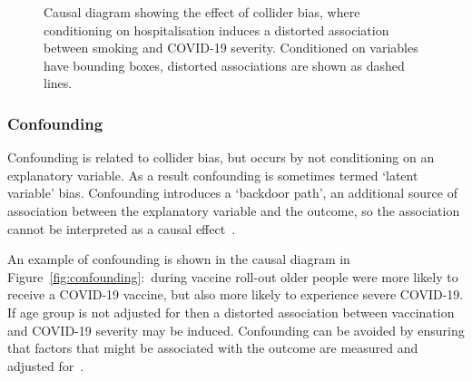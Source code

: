 \begin{figure}[htbp!]
    \centering
    \caption[Causal diagram showing the effect of collider bias]{Causal diagram showing the effect of collider bias, where conditioning on hospitalisation induces a distorted association between smoking and COVID-19 severity. Conditioned on variables have bounding boxes, distorted associations are shown as dashed lines.}\label{fig:collider-bias}
\end{figure}

\subsubsection{Confounding}

Confounding is related to collider bias, but occurs by not conditioning on an explanatory variable. As a result confounding is sometimes termed `latent variable' bias. Confounding introduces a `backdoor path', an additional source of association between the explanatory variable and the outcome, so the association cannot be interpreted as a causal effect~\parencite{Hernan2023-de}.

An example of confounding is shown in the causal diagram in Figure~\ref{fig:confounding}:\ during vaccine roll-out older people were more likely to receive a COVID-19 vaccine, but also more likely to experience severe COVID-19. If age group is not adjusted for then a distorted association between vaccination and COVID-19 severity may be induced. Confounding can be avoided by ensuring that factors that might be associated with the outcome are measured and adjusted for~\parencite{Hernan2023-de}.

